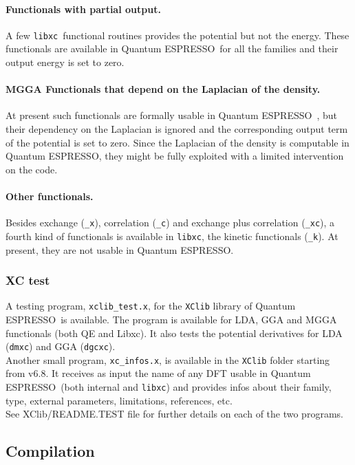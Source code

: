 \documentclass[12pt,a4paper]{article}
\def\qe{{\sc Quantum ESPRESSO}}
\def\libxc{\texttt{libxc}}
\begin{document}
\paragraph{Functionals with partial output.}
A few \libxc\ functional routines provides the potential but not the energy. These functionals are available in \qe\ for all the families and their output energy is set to zero.
%
\paragraph{MGGA Functionals that depend on the Laplacian of the density.} At present such functionals are formally usable in \qe\ , but their dependency on the Laplacian is ignored and the corresponding output term of the potential is set to zero. Since the Laplacian of the density is computable in \qe, they might be fully exploited with a limited intervention on the code.
%
\paragraph{Other functionals.} Besides exchange (\texttt{\_x}), correlation (\texttt{\_c}) and exchange plus correlation (\texttt{\_xc}), a fourth kind of functionals is available in \libxc, the kinetic functionals (\texttt{\_k}). At present, they are not usable in \qe.
%
\subsubsection{XC test}
\label{SubSec:XCtest}
A testing program, \texttt{xclib\_test.x}, for the \texttt{XClib} library of \qe\ is available. The program is available for LDA, GGA and MGGA functionals (both QE and Libxc). It also tests the potential derivatives for LDA (\texttt{dmxc}) and GGA (\texttt{dgcxc}).\\
Another small program, \texttt{xc\_infos.x}, is available in the \texttt{XClib} folder starting from v6.8. It receives as input the name of any DFT usable in \qe\ (both internal and \libxc) and provides infos about their family, type, external parameters, limitations, references, etc.\\
See XClib/README.TEST file for further details on each of the two programs.

\subsection{Compilation}
\label{SubSec:Compilation}
\end{document}
